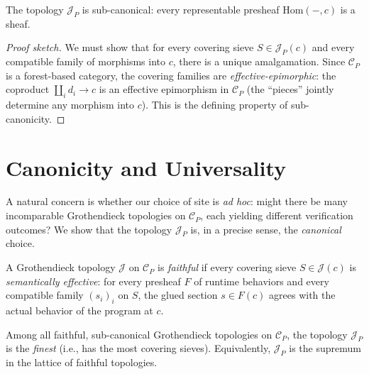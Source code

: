 \documentclass[11pt]{article}
\begin{document}
\begin{proposition}\label{prop:subcanonical}
The topology $\mathscr{J}_P$ is sub-canonical: every representable presheaf
$\mathrm{Hom}(-,c)$ is a sheaf.
\end{proposition}

\begin{proof}[Proof sketch]
We must show that for every covering sieve $S \in \mathscr{J}_P(c)$ and
every compatible family of morphisms into $c$, there is a unique amalgamation.
Since $\mathcal{C}_P$ is a forest-based category, the covering families are
\emph{effective-epimorphic}: the coproduct $\coprod_i d_i \to c$ is an
effective epimorphism in $\mathcal{C}_P$ (the ``pieces'' jointly determine
any morphism into $c$).  This is the defining property of sub-canonicity.
\end{proof}

\section{Canonicity and Universality}\label{sec:canonicity}

A natural concern is whether our choice of site is \emph{ad hoc}:
might there be many incomparable Grothendieck topologies on $\mathcal{C}_P$,
each yielding different verification outcomes?  We show that the topology
$\mathscr{J}_P$ is, in a precise sense, the \emph{canonical} choice.

\begin{definition}\label{def:faithful}
A Grothendieck topology $\mathscr{J}$ on $\mathcal{C}_P$ is
\emph{faithful} if every covering sieve $S \in \mathscr{J}(c)$ is
\emph{semantically effective}: for every presheaf $F$ of
runtime behaviors and every compatible family $(s_i)_{i}$ on $S$,
the glued section $s \in F(c)$ agrees with the actual behavior of
the program at $c$.
\end{definition}

\begin{theorem}[Canonicity]\label{thm:canonicity}
Among all faithful, sub-canonical Grothendieck topologies on
$\mathcal{C}_P$, the topology $\mathscr{J}_P$ is the \emph{finest}
(i.e., has the most covering sieves).  Equivalently, $\mathscr{J}_P$
is the supremum in the lattice of faithful topologies.
\end{theorem}
\end{document}

